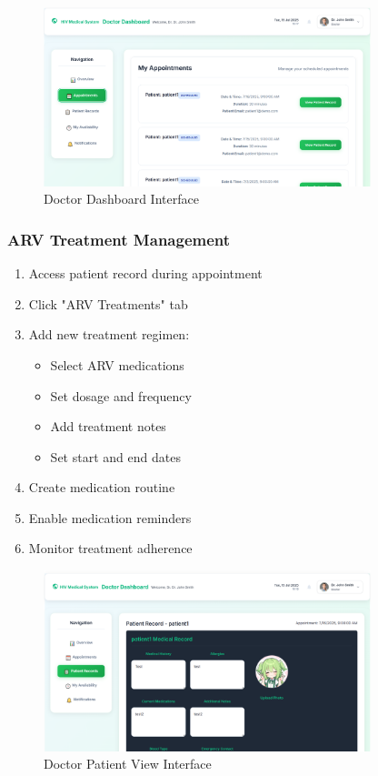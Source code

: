 \documentclass[12pt,a4paper]{article}
\begin{document}
\begin{figure}[H]
\centering
\includegraphics[width=0.85\textwidth]{doctor_dashboard.png}
\caption{Doctor Dashboard Interface}
\label{fig:doctor-dashboard}
\end{figure}

\subsubsection{ARV Treatment Management}

\begin{enumerate}
    \item Access patient record during appointment
    \item Click "ARV Treatments" tab
    \item Add new treatment regimen:
    \begin{itemize}
        \item Select ARV medications
        \item Set dosage and frequency
        \item Add treatment notes
        \item Set start and end dates
    \end{itemize}
    \item Create medication routine
    \item Enable medication reminders
    \item Monitor treatment adherence
\end{enumerate}

\begin{figure}[H]
\centering
\includegraphics[width=0.85\textwidth]{doctor_patientview.png}
\caption{Doctor Patient View Interface}
\label{fig:doctor-patientview}
\end{figure}
\end{document}
